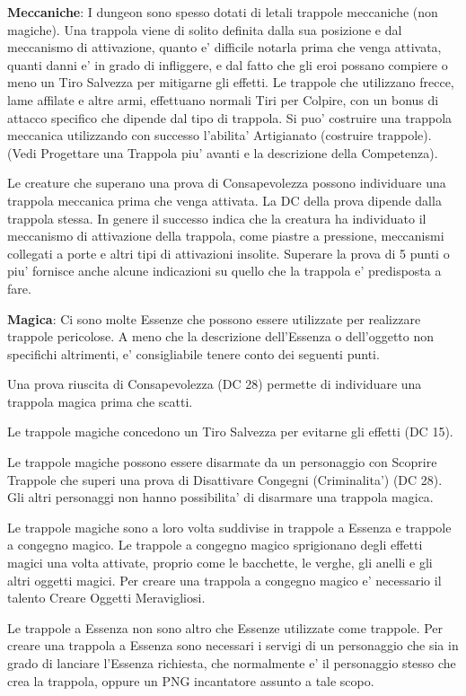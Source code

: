 \documentclass[a4paper,11pt,twoside,openany]{book}
\begin{document}
{		\textbf{Meccaniche}: I dungeon sono spesso dotati di letali trappole meccaniche (non magiche). Una trappola viene di solito definita dalla sua posizione e dal meccanismo di attivazione, quanto e' difficile notarla prima che venga attivata, quanti danni e' in grado di infliggere, e dal fatto che gli eroi possano compiere o meno un Tiro Salvezza per mitigarne gli effetti. Le trappole che utilizzano frecce, lame affilate e altre armi, effettuano normali Tiri per Colpire, con un bonus di attacco specifico che dipende dal tipo di trappola. Si puo' costruire una trappola meccanica utilizzando con successo l'abilita' Artigianato (costruire trappole). (Vedi Progettare una Trappola piu' avanti e la descrizione della Competenza).
		
		Le creature che superano una prova di Consapevolezza possono individuare una trappola meccanica prima che venga attivata. La DC della prova dipende dalla trappola stessa. In genere il successo indica che la creatura ha individuato il meccanismo di attivazione della trappola, come piastre a pressione, meccanismi collegati a porte e altri tipi di attivazioni insolite. Superare la prova di 5 punti o piu' fornisce anche alcune indicazioni su quello che la trappola e' predisposta a fare.
		
		\textbf{Magica}: Ci sono molte Essenze che possono essere utilizzate per realizzare trappole pericolose. A meno che la descrizione dell'Essenza o dell'oggetto non specifichi altrimenti, e' consigliabile tenere conto dei seguenti punti.
		
		Una prova riuscita di Consapevolezza (DC 28) permette di individuare una trappola magica prima che scatti.
		
		Le trappole magiche concedono un Tiro Salvezza per evitarne gli effetti (DC 15).
		
		Le trappole magiche possono essere disarmate da un personaggio con Scoprire Trappole che superi una prova di Disattivare Congegni (Criminalita') (DC 28). Gli altri personaggi non hanno possibilita' di disarmare una trappola magica.
		
		Le trappole magiche sono a loro volta suddivise in trappole a Essenza e trappole a congegno magico. Le trappole a congegno magico sprigionano degli effetti magici una volta attivate, proprio come le bacchette, le verghe, gli anelli e gli altri oggetti magici. Per creare una trappola a congegno magico e' necessario il talento Creare Oggetti Meravigliosi. 
		
		Le trappole a Essenza non sono altro che Essenze utilizzate come trappole. Per creare una trappola a Essenza sono necessari i servigi di un personaggio che sia in grado di lanciare l'Essenza richiesta, che normalmente e' il personaggio stesso che crea la trappola, oppure un PNG incantatore assunto a tale scopo.
		
}
\end{document}
